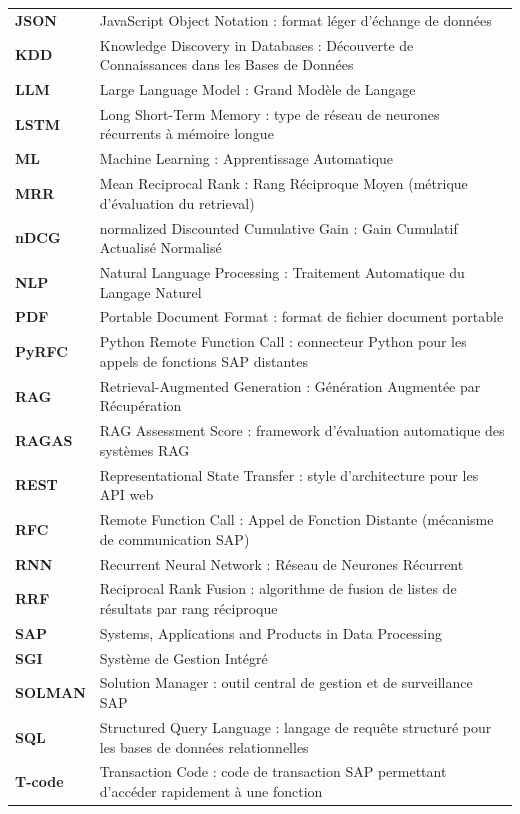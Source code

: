 \documentclass[12pt,a4paper]{report}
\begin{document}
\begin{longtable}{@{}>{\bfseries\color{primaryblue}}l @{\hspace{1.5cm}} p{11.2cm}@{}}
JSON      & JavaScript Object Notation : format léger d'échange de données \\
KDD       & Knowledge Discovery in Databases : Découverte de Connaissances dans les Bases de Données \\
LLM       & Large Language Model : Grand Modèle de Langage \\
LSTM      & Long Short-Term Memory : type de réseau de neurones récurrents à mémoire longue \\
ML        & Machine Learning : Apprentissage Automatique \\
MRR       & Mean Reciprocal Rank : Rang Réciproque Moyen (métrique d'évaluation du retrieval) \\
nDCG      & normalized Discounted Cumulative Gain : Gain Cumulatif Actualisé Normalisé \\
NLP       & Natural Language Processing : Traitement Automatique du Langage Naturel \\
PDF       & Portable Document Format : format de fichier document portable \\
PyRFC     & Python Remote Function Call : connecteur Python pour les appels de fonctions SAP distantes \\
RAG       & Retrieval-Augmented Generation : Génération Augmentée par Récupération \\
RAGAS     & RAG Assessment Score : framework d'évaluation automatique des systèmes RAG \\
REST      & Representational State Transfer : style d'architecture pour les API web \\
RFC       & Remote Function Call : Appel de Fonction Distante (mécanisme de communication SAP) \\
RNN       & Recurrent Neural Network : Réseau de Neurones Récurrent \\
RRF       & Reciprocal Rank Fusion : algorithme de fusion de listes de résultats par rang réciproque \\
SAP       & Systems, Applications and Products in Data Processing \\
SGI       & Système de Gestion Intégré \\
SOLMAN    & Solution Manager : outil central de gestion et de surveillance SAP \\
SQL       & Structured Query Language : langage de requête structuré pour les bases de données relationnelles \\
T-code    & Transaction Code : code de transaction SAP permettant d'accéder rapidement à une fonction \\

\end{longtable}
\end{document}
